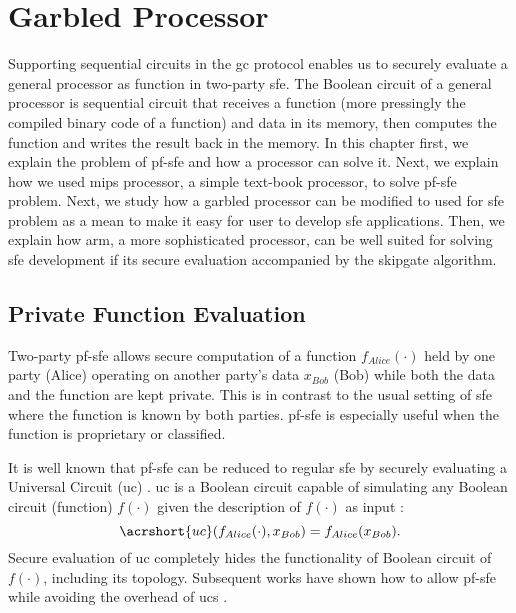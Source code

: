 \chapter{Garbled Processor}\label{chap:processor}
Supporting sequential circuits in the \acrshort{gc} protocol enables us to securely evaluate a general processor as function in two-party \acrshort{sfe}.
The Boolean circuit of a general processor is sequential circuit that receives a function (more pressingly the compiled binary code of a function) and data in its memory, then computes the function and writes the result back in the memory.
In this chapter first, we explain the problem of \acrfull{pf-sfe} and how a processor can solve it.
Next, we explain how we used \gls{mips} processor, a simple text-book processor, to solve \acrshort{pf-sfe} problem.
Next, we study how a garbled processor can be modified to used for \acrshort{sfe} problem as a mean to make it easy for user to develop \acrshort{sfe} applications.
Then, we explain how \gls{arm}, a more sophisticated processor, can be well suited for solving \acrshort{sfe} development if its secure evaluation accompanied by the \gls{skipgate} algorithm.

\section{Private Function Evaluation}\label{sec:processor-pfsfe}
Two-party \acrfull{pf-sfe} allows secure computation of a function $f_{Alice}(\cdot)$ held by one party (Alice) operating on another party's data $x_{Bob}$ (Bob) while both the data and the function are kept private.
This is in contrast to the usual setting of \acrshort{sfe} where the function is known by both parties.
\acrshort{pf-sfe} is especially useful when the function is proprietary or classified.

It is well known that \acrshort{pf-sfe} can be reduced to regular \acrshort{sfe} by securely evaluating a Universal Circuit (\acrshort{uc}) \cite{sander1999non}.
\acrshort{uc} is a Boolean circuit capable of simulating any Boolean circuit (function) $f(\cdot)$ given the description of $f(\cdot)$ as input \cite{valiant1976universal,kolesnikov2008practical}:
$$\acrshort{uc}(f_{Alice}(\cdot),x_{Bob}) = f_{Alice}(x_{Bob}).$$
Secure evaluation of \acrshort{uc} completely hides the functionality of Boolean circuit of $f(\cdot)$, including its topology.
Subsequent works have shown how to allow \acrshort{pf-sfe} while avoiding the overhead of \acrshort{uc}s \cite{katz2011constant, mohassel2013hide}.

